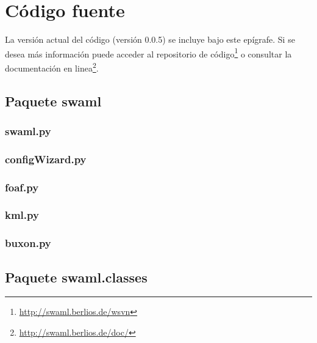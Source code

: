 
\chapter{Código fuente\label{sec:source}} 

La versión actual del código (versión 0.0.5) se incluye bajo este epígrafe. Si
se desea más información puede acceder al repositorio de código\footnote{\url{http://swaml.berlios.de/wsvn}}
o consultar la documentación en linea\footnote{\url{http://swaml.berlios.de/doc/}}.

\section*{Paquete swaml}

\subsection*{swaml.py}



\subsection*{configWizard.py}



\subsection*{foaf.py}



\subsection*{kml.py}



\subsection*{buxon.py}




\section*{Paquete swaml.classes}

